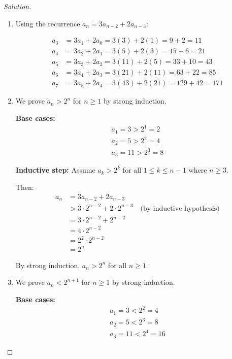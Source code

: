 \documentclass[12pt]{article}
\begin{document}
\begin{proof}[Solution]
~
\begin{enumerate}[label=(\alph*)]
    \item Using the recurrence $a_n = 3a_{n-2} + 2a_{n-3}$:
    
    \begin{align*}
    a_3 &= 3a_1 + 2a_0 = 3(3) + 2(1) = 9 + 2 = 11 \\
    a_4 &= 3a_2 + 2a_1 = 3(5) + 2(3) = 15 + 6 = 21 \\
    a_5 &= 3a_3 + 2a_2 = 3(11) + 2(5) = 33 + 10 = 43 \\
    a_6 &= 3a_4 + 2a_3 = 3(21) + 2(11) = 63 + 22 = 85 \\
    a_7 &= 3a_5 + 2a_4 = 3(43) + 2(21) = 129 + 42 = 171
    \end{align*}
    
    \item We prove $a_n > 2^n$ for $n \geq 1$ by strong induction.
    
    \textbf{Base cases:}
    \begin{align*}
    a_1 = 3 > 2^1 = 2 \\
    a_2 = 5 > 2^2 = 4 \\
    a_3 = 11 > 2^3 = 8
    \end{align*}
    
    \textbf{Inductive step:} Assume $a_k > 2^k$ for all $1 \leq k \leq n-1$ where $n \geq 3$.
    
    Then:
    \begin{align*}
    a_n &= 3a_{n-2} + 2a_{n-3} \\
    &> 3 \cdot 2^{n-2} + 2 \cdot 2^{n-3} \quad \text{(by inductive hypothesis)} \\
    &= 3 \cdot 2^{n-2} + 2^{n-2} \\
    &= 4 \cdot 2^{n-2} \\
    &= 2^2 \cdot 2^{n-2} \\
    &= 2^n
    \end{align*}
    
    By strong induction, $a_n > 2^n$ for all $n \geq 1$.
    
    \item We prove $a_n < 2^{n+1}$ for $n \geq 1$ by strong induction.
    
    \textbf{Base cases:}
    \begin{align*}
    a_1 = 3 < 2^2 = 4 \\
    a_2 = 5 < 2^3 = 8 \\
    a_3 = 11 < 2^4 = 16
    \end{align*}
    

\end{enumerate}
\end{proof}
\end{document}
